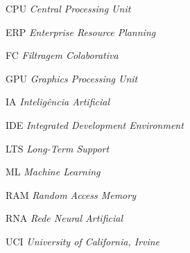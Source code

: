 \documentclass[
	12pt,	%
	openright,			%
	oneside,            %
	a4paper,			%
	english,			%
	french,				%
	spanish,			%
	brazil				%
]{abntex2}
\begin{document}
\listoftables*
\cleardoublepage

\begin{siglas}
    \item [CPU] \textit{Central Processing Unit}
    \item [ERP] \textit{Enterprise Resource Planning}
    \item [FC] \textit{Filtragem Colaborativa}
    \item [GPU] \textit{Graphics Processing Unit}
    \item [IA] \textit{Inteligência Artificial}
    \item [IDE] \textit{Integrated Development Environment}
    \item [LTS] \textit{Long-Term Support}
    \item [ML] \textit{Machine Learning}
    \item [RAM] \textit{Random Access Memory}
    \item [RNA] \textit{Rede Neural Artificial}
    \item [UCI] \textit{University of California, Irvine}
\end{siglas}

\tableofcontents*
\cleardoublepage

\textual








\postextual


\end{document}
